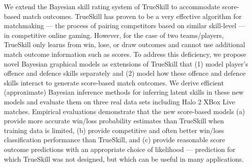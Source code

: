 We extend the Bayesian skill rating system of TrueSkill to accommodate
score-based match outcomes. TrueSkill has proven to be a very
effective algorithm for matchmaking --- the process of pairing
competitors based on similar skill-level --- in competitive online
gaming.  However, for the case of two teams/players, TrueSkill only
learns from win, lose, or draw outcomes and cannot use additional
match outcome information such as scores.  To address this deficiency,
we propose novel Bayesian graphical models as extensions of TrueSkill
that (1) model player's offence and defence skills separately and (2)
model how these offence and defence skills interact to generate
score-based match outcomes.  We derive efficient (approximate)
Bayesian inference methods for inferring latent skills in these new
models and evaluate them on three real data sets including Halo 2 XBox
Live matches. Empirical evaluations demonstrate that the new
score-based models (a) provide more accurate win/loss probability
estimates than TrueSkill when training data is limited,
(b) provide competitive and often better win/loss classification
performance than TrueSkill, and (c) provide reasonable score outcome predictions with an
appropriate choice of likelihood --- prediction for which TrueSkill was not
designed, but which can be useful in many applications.